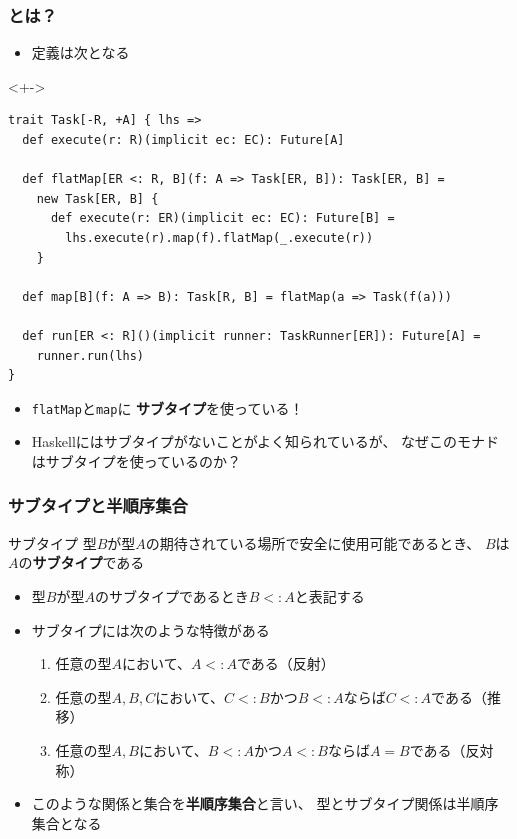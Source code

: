 \begin{frame}[fragile]
  \frametitle{\Fujitask とは？}

  \begin{itemize}
    \item<+-> 定義は次となる
  \end{itemize}

  \begin{uncoverenv}<+->
\begin{lstlisting}[style=scala]
trait Task[-R, +A] { lhs =>
  def execute(r: R)(implicit ec: EC): Future[A]

  def flatMap[ER <: R, B](f: A => Task[ER, B]): Task[ER, B] =
    new Task[ER, B] {
      def execute(r: ER)(implicit ec: EC): Future[B] =
        lhs.execute(r).map(f).flatMap(_.execute(r))
    }

  def map[B](f: A => B): Task[R, B] = flatMap(a => Task(f(a)))

  def run[ER <: R]()(implicit runner: TaskRunner[ER]): Future[A] =
    runner.run(lhs)
}
\end{lstlisting}
  \end{uncoverenv}

  \begin{itemize}
    \item<+-> \lstinline|flatMap|と\lstinline|map|に
    \textbf{サブタイプ}を使っている！

    \item<+-> Haskellにはサブタイプがないことがよく知られているが、
    なぜこのモナドはサブタイプを使っているのか？
  \end{itemize}
\end{frame}

\begin{frame}
  \frametitle{サブタイプと半順序集合}

  \pause
  \begin{block}{サブタイプ}
    型$B$が型$A$の期待されている場所で安全に使用可能であるとき、
    $B$は$A$の\textbf{サブタイプ}である

    \begin{itemize}
      \item 型$B$が型$A$のサブタイプであるとき$B <: A$と表記する
    \end{itemize}
  \end{block}

  \pause
  \begin{itemize}
    \item<+-> サブタイプには次のような特徴がある
    \begin{enumerate}
      \item<+-> 任意の型$A$において、$A <: A$である（反射）
      \item<+-> 任意の型$A, B, C$において、$C <: B$かつ$B <: A$ならば$C <: A$である（推移）
      \item<+-> 任意の型$A, B$において、$B <: A$かつ$A <: B$ならば$A = B$である（反対称）
    \end{enumerate}

    \item<+-> このような関係と集合を\textbf{半順序集合}と言い、
    型とサブタイプ関係は半順序集合となる
  \end{itemize}
\end{frame}


